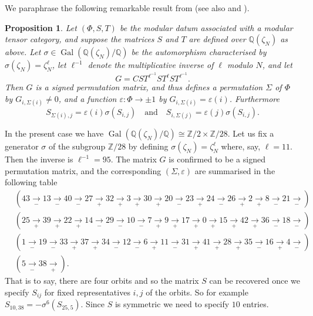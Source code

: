 \documentclass[12pt]{amsart}
\theoremstyle{plain}
\newtheorem{prop}[thm]{Proposition}
\theoremstyle{definition}
\numberwithin{equation}{section}
\DeclareMathOperator{\Gal}{Gal}
\newcommand{\Q}{\mathbb{Q}}
\newcommand{\Z}{\mathbb{Z}}
\begin{document}

We paraphrase the following remarkable result from {\cite[Proposition 2.2]{GM}} (see also \cite{CG94} and \cite{CG99}).
\begin{prop}
Let $(\Phi, S, T)$ be the modular datum associated with a modular tensor category, and suppose the matrices $S$ and $T$ are defined over $\Q(\zeta_N)$ as above. Let $\sigma \in \Gal(\Q(\zeta_N)/\Q)$ be the automorphism characterised by $\sigma(\zeta_N) = \zeta_N^\ell$, let $\ell^{-1}$ denote the multiplicative inverse of $\ell$ modulo $N$, and let
\[
G = C ST^{\ell^{-1}} ST^\ell ST^{\ell^{-1}}.
\]
Then $G$ is a signed permutation matrix, and thus defines a permutation $\Sigma$ of $\Phi$ by $G_{i, \Sigma(i)} \neq 0$, and a function $\varepsilon : \Phi \rightarrow {\pm 1}$ by $G_{i, \Sigma(i)} = \varepsilon(i)$. Furthermore
\[
S_{\Sigma(i), j} = \varepsilon(i) \sigma(S_{i, j}) \quad \text{and} \quad S_{i, \Sigma(j)} = \varepsilon(j) \sigma(S_{i, j}).
\]
\end{prop}
In the present case we have $\Gal(\Q(\zeta_N)/\Q) \cong \Z/2 \times \Z/28$.
Let us fix a generator $\sigma$ of the subgroup $\Z/28$ by defining $\sigma(\zeta_N) = \zeta_N^\ell$ where, say, $\ell = 11$. Then the inverse is $\ell^{-1} = 95$. The matrix $G$ is confirmed to be a signed permutation matrix, and the corresponding $(\Sigma, \varepsilon)$ are summarised in the following table
\begin{align*}
&(43 \xrightarrow[-]{} 13 \xrightarrow[-]{} 40 \xrightarrow[-]{} 27 \xrightarrow[+]{} 32 \xrightarrow[+]{} 3 \xrightarrow[+]{} 30 \xrightarrow[+]{} 20 \xrightarrow[-]{} 23 \xrightarrow[+]{} 24 \xrightarrow[-]{} 26 \xrightarrow[+]{} 2 \xrightarrow[+]{} 8 \xrightarrow[-]{} 21 \xrightarrow[-]{}) \\
%
&(25 \xrightarrow[+]{} 39 \xrightarrow[+]{} 22 \xrightarrow[+]{} 14 \xrightarrow[-]{} 29 \xrightarrow[-]{} 10 \xrightarrow[-]{} 7 \xrightarrow[+]{} 9 \xrightarrow[+]{} 17 \xrightarrow[+]{} 0 \xrightarrow[+]{} 15 \xrightarrow[+]{} 42 \xrightarrow[+]{} 36 \xrightarrow[-]{} 18 \xrightarrow[-]{} ) \\
%
&(1 \xrightarrow[-]{} 19 \xrightarrow[-]{} 33 \xrightarrow[+]{} 37 \xrightarrow[+]{} 34 \xrightarrow[-]{} 12 \xrightarrow[-]{} 6 \xrightarrow[+]{} 11 \xrightarrow[-]{} 31 \xrightarrow[+]{} 41 \xrightarrow[+]{} 28 \xrightarrow[+]{} 35 \xrightarrow[-]{} 16 \xrightarrow[+]{} 4 \xrightarrow[-]{}) \\
%
&(5 \xrightarrow[-]{} 38 \xrightarrow[+]{}).
\end{align*}
That is to say, there are four orbits and so the matrix $S$ can be recovered once we specify $S_{ij}$ for fixed representatives $i, j$ of the orbits. So for example $S_{10, 38} = -\sigma^{6}(S_{25, 5})$. Since $S$ is symmetric we need to specify $10$ entries.
\end{document}
